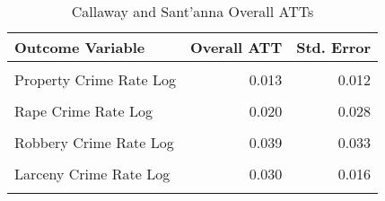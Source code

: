 \begin{table}[H]

\caption{\label{tab:tab:cs}Callaway and Sant'anna Overall ATTs}
\centering
\begin{tabular}[t]{lrr}
\toprule
Outcome Variable & Overall ATT & Std. Error\\
\midrule
\cellcolor{gray!6}{Violent Crime Rate Log} & \cellcolor{gray!6}{-0.010} & \cellcolor{gray!6}{0.025}\\
Property Crime Rate Log & 0.013 & 0.012\\
\cellcolor{gray!6}{Murder Crime Rate Log} & \cellcolor{gray!6}{-0.049} & \cellcolor{gray!6}{0.027}\\
Rape Crime Rate Log & 0.020 & 0.028\\
\cellcolor{gray!6}{Assault Crime Rate Log} & \cellcolor{gray!6}{0.005} & \cellcolor{gray!6}{0.041}\\
\addlinespace
Robbery Crime Rate Log & 0.039 & 0.033\\
\cellcolor{gray!6}{Burglary Crime Rate Log} & \cellcolor{gray!6}{-0.016} & \cellcolor{gray!6}{0.016}\\
Larceny Crime Rate Log & 0.030 & 0.016\\
\cellcolor{gray!6}{Autotheft Crime Rate Log} & \cellcolor{gray!6}{0.011} & \cellcolor{gray!6}{0.041}\\
\bottomrule
\end{tabular}
\end{table}
